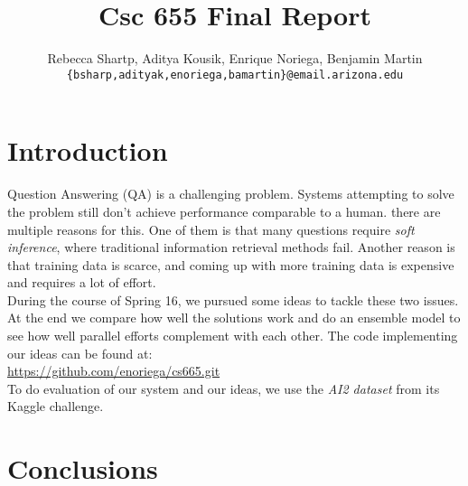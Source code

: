 \documentclass[11pt]{article}
\title{Csc 655 Final Report}
\author{Rebecca Shartp, Aditya Kousik, Enrique Noriega, Benjamin Martin\\
  {\tt \{bsharp,adityak,enoriega,bamartin\}@email.arizona.edu} \\}
\date{}
\begin{document}
\maketitle
\begin{abstract}
  
\end{abstract}

\section{Introduction}

Question Answering (QA) is a challenging problem. Systems attempting to solve the problem still don't achieve performance comparable to a human. there are multiple reasons for this. One of them is that many questions require \emph{soft inference}, where traditional information retrieval methods fail. Another reason is that training data is scarce, and coming up with more training data is expensive and requires a lot of effort. \\

During the course of Spring 16, we pursued some ideas to tackle these two issues. At the end we compare how well the solutions work and do an ensemble model to see how well parallel efforts complement with each other. The code implementing our ideas can be found at:\\ 
\url{https://github.com/enoriega/cs665.git}\\

To do evaluation of our system and our ideas, we use the \emph{AI2 dataset} from its Kaggle challenge.








\section{Conclusions}

%
%
\end{document}
